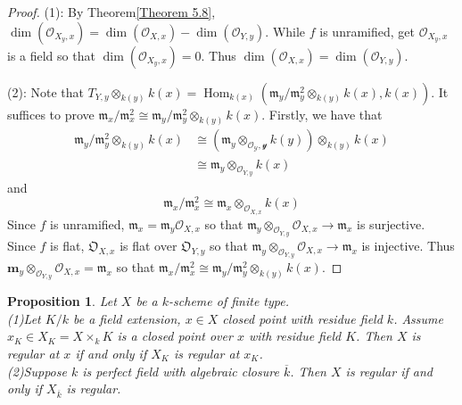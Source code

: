 \documentclass{ctexart}
\newtheorem{proposition}{Proposition}[section]
\renewcommand{\hom}{\operatorname{Hom}}
\begin{document}
\begin{proof}
    (1): By Theorem\ref{Theorem 5.8}, $\dim(\mathcal{O}_{X_{y}, x}) = \dim(\mathcal{O}_{X, x}) - \dim(\mathcal{O}_{Y, y})$.
    While $f$ is unramified, get $\mathcal{O}_{X_{y}, x}$ is a field so that $\dim(\mathcal{O}_{X_{y}, x}) = 0$.
    Thus $\dim(\mathcal{O}_{X, x}) = \dim(\mathcal{O}_{Y, y})$.
    \par
    (2): Note that $T_{Y, y} \otimes_{k(y)} k(x) = \hom_{k(x)}(\mathfrak{m}_{y}/\mathfrak{m}_{y}^{2} \otimes_{k(y)} k(x), k(x))$.
    It suffices to prove $\mathfrak{m}_{x}/\mathfrak{m}_{x}^{2} \cong \mathfrak{m}_{y}/\mathfrak{m}_{y}^{2} \otimes_{k(y)} k(x)$.
    Firstly, we have that
    \begin{equation*}
        \begin{split}
            \mathfrak{m}_{y}/\mathfrak{m}_{y}^{2} \otimes_{k(y)} k(x) & \cong (\mathfrak{m}_{y} \otimes_{\mathcal{O_{Y}, y}} k(y)) \otimes_{k(y)} k(x) \\
            & \cong \mathfrak{m}_{y} \otimes_{\mathcal{O}_{Y, y}} k(x)
        \end{split}
    \end{equation*}
    and 
    \begin{equation*}
        \mathfrak{m}_{x}/\mathfrak{m}_{x}^{2} \cong \mathfrak{m}_{x} \otimes_{\mathcal{O}_{X, x}} k(x) 
    \end{equation*}
    Since $f$ is unramified, $\mathfrak{m}_{x} = \mathfrak{m}_{y}\mathcal{O}_{X, x}$ so that $\mathfrak{m}_{y} \otimes_{\mathcal{O}_{Y, y}} \mathcal{O}_{X, x} \longrightarrow \mathfrak{m}_{x}$ is surjective.
    Since $f$ is flat, $\mathfrak{O}_{X, x}$ is flat over $\mathfrak{O}_{Y, y}$ so that $\mathfrak{m}_{y} \otimes_{\mathcal{O}_{Y, y}} \mathcal{O}_{X, x} \longrightarrow \mathfrak{m}_{x}$ is injective.
    Thus $\mathbf{m}_{y} \otimes_{\mathcal{O}_{Y, y}} \mathcal{O}_{X, x} = \mathfrak{m}_{x}$ so that $\mathfrak{m}_{x}/\mathfrak{m}_{x}^{2} \cong \mathfrak{m}_{y}/\mathfrak{m}_{y}^{2} \otimes_{k(y)} k(x)$.
\end{proof}
\begin{proposition}
    Let $X$ be a $k$-scheme of finite type. \\
    (1)Let $K/k$ be a field extension, $x\in X$ closed point with residue field $k$.
    Assume $x_{K}\in X_{K} = X \times_{k} K$ is a closed point over $x$ with residue field $K$.
    Then $X$ is regular at $x$ if and only if $X_{K}$ is regular at $x_{K}$. \\
    (2)Suppose $k$ is perfect field with algebraic closure $\overline{k}$.
    Then $X$ is regular if and only if $X_{\overline{k}}$ is regular.
    \label{Proposition 5.9}
\end{proposition}
\end{document}
